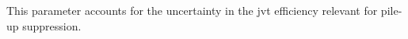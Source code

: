 \begin{description}[font=\normalfont]
\item[syst\_PRW\_DATASF:] 
\item[syst\_JvtEfficiency:] This parameter accounts for the uncertainty in the
  \gls{jvt} efficiency relevant for pile-up suppression.
\end{description}
